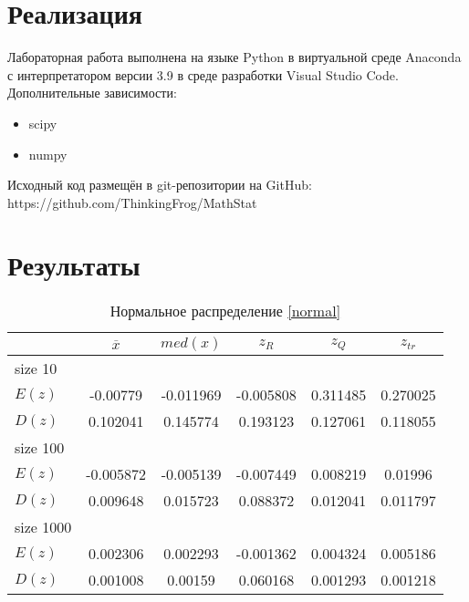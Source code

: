\documentclass[12pt,a4paper]{article}
\begin{document}
\section{Реализация}
Лабораторная работа выполнена на языке Python в виртуальной среде Anaconda с интерпретатором версии 3.9 в среде разработки Visual Studio Code. Дополнительные зависимости:
\begin{itemize}
    \item scipy
    \item numpy
\end{itemize}

Исходный код размещён в git-репозитории на GitHub: \\ https://github.com/ThinkingFrog/MathStat

\section {Результаты}
\begin{table}[H]
    \centering
    \begin{tabular}{|l||c|c|c|c|c|}
        \hline
        & $\overline{x}$ & $med(x)$ & $z_R$ & $z_Q$ & $z_{tr}$\\\hline\hline
        size 10 & & & & &\\\hline
        $E(z)$ & -0.00779 & -0.011969 & -0.005808 & 0.311485 & 0.270025\\\hline
        $D(z)$ & 0.102041 & 0.145774 & 0.193123 & 0.127061 & 0.118055\\\hline
        size 100 & & & & &\\\hline
        $E(z)$ & -0.005872 & -0.005139 & -0.007449 & 0.008219 & 0.01996\\\hline
        $D(z)$ & 0.009648 & 0.015723 & 0.088372 & 0.012041 & 0.011797\\\hline
        size 1000 & & & & &\\\hline
        $E(z)$ & 0.002306 & 0.002293 & -0.001362 & 0.004324 & 0.005186\\\hline
        $D(z)$ & 0.001008 & 0.00159 & 0.060168 & 0.001293 & 0.001218\\\hline
    \end{tabular}
    \caption{Нормальное распределение \eqref{normal}}
    \label{tab:normal}
\end{table}
\end{document}
